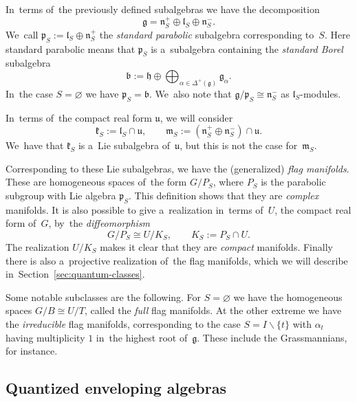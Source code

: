 \documentclass[10pt,a4paper]{amsart}
\numberwithin{equation}{section}
\newcommand{\lieb}{\mathfrak{b}}
\newcommand{\lieg}{\mathfrak{g}}
\newcommand{\lieh}{\mathfrak{h}}
\newcommand{\liek}{\mathfrak{k}}
\newcommand{\liel}{\mathfrak{l}}
\newcommand{\liem}{\mathfrak{m}}
\newcommand{\lien}{\mathfrak{n}}
\newcommand{\liep}{\mathfrak{p}}
\newcommand{\lieu}{\mathfrak{u}}
\begin{document}
In~terms of~the previously defined subalgebras we have the decomposition
\[
\lieg = \lien_S^+ \oplus \liel_S \oplus \lien_S^-.
\]
We~call $\liep_S := \liel_S \oplus \lien_S^+$ the \emph{standard parabolic} subalgebra corresponding to~$S$.
Here standard parabolic means that $\liep_S$ is a~subalgebra containing the \emph{standard Borel} subalgebra
\[
\lieb := \lieh \oplus \bigoplus_{\alpha \in \Delta^+(\lieg)} \lieg_\alpha.
\]
In~the case $S = \varnothing$ we have $\liep_S = \lieb$.
We~also note that $\lieg / \liep_S \cong \lien_S^-$ as $\liel_S$-modules.

In~terms of~the compact real form $\lieu$, we will consider
\[
\liek_S := \liel_S \cap \lieu, \qquad
\liem_S := (\lien_S^+ \oplus \lien_S^-) \cap \lieu.
\]
We~have that $\liek_S$ is a~Lie subalgebra of~$\lieu$, but this is not the case for~$\liem_S$.

Corresponding to these Lie subalgebras, we have the (generalized) \emph{flag manifolds}.
These are homogeneous spaces of~the form $G / P_S$, where $P_S$ is the parabolic subgroup with Lie algebra $\liep_S$.
This definition shows that they are \emph{complex} manifolds.
It is also possible to give a~realization in~terms of~$U$, the compact real form of~$G$, by~the \emph{diffeomorphism}
\[
G / P_S \cong U / K_S, \qquad K_S := P_S \cap U.
\]
The realization $U / K_S$ makes it clear that they are \emph{compact} manifolds.
Finally there is also a~projective realization of~the flag manifolds, which we will describe in~Section~\ref{sec:quantum-classes}.

Some notable subclasses are the following.
For $S = \varnothing$ we have the homogeneous spaces $G / B \cong U / T$, called the \emph{full} flag manifolds.
At the other extreme we have the \emph{irreducible} flag manifolds, corresponding to the case $S = I \backslash \{t\}$ with $\alpha_t$ having multiplicity $1$ in~the highest root of~$\lieg$. These include the Grassmannians, for instance.

\subsection{Quantized enveloping algebras}
\end{document}
